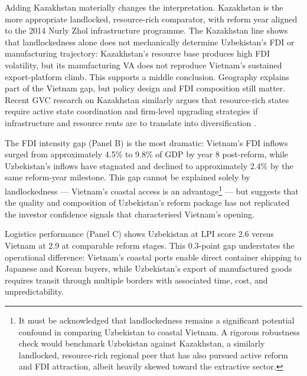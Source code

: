 \documentclass[14pt,a4paper]{extarticle}
\begin{document}
Adding Kazakhstan materially changes the interpretation. Kazakhstan is the more appropriate landlocked, resource-rich comparator, with reform year aligned to the 2014 Nurly Zhol infrastructure programme. The Kazakhstan line shows that landlockedness alone does not mechanically determine Uzbekistan's FDI or manufacturing trajectory: Kazakhstan's resource base produces high FDI volatility, but its manufacturing VA does not reproduce Vietnam's sustained export-platform climb. This supports a middle conclusion. Geography explains part of the Vietnam gap, but policy design and FDI composition still matter. Recent GVC research on Kazakhstan similarly argues that resource-rich states require active state coordination and firm-level upgrading strategies if infrastructure and resource rents are to translate into diversification \citep{deremer2025kazakhstan}.

The FDI intensity gap (Panel B) is the most dramatic: Vietnam's FDI inflows surged from approximately 4.5\% to 9.8\% of GDP by year 8 post-reform, while Uzbekistan's inflows have stagnated and declined to approximately 2.4\% by the same reform-year milestone. This gap cannot be explained solely by landlockedness --- Vietnam's coastal access is an advantage\footnote{It must be acknowledged that landlockedness remains a significant potential confound in comparing Uzbekistan to coastal Vietnam. A rigorous robustness check would benchmark Uzbekistan against Kazakhstan, a similarly landlocked, resource-rich regional peer that has also pursued active reform and FDI attraction, albeit heavily skewed toward the extractive sector.} --- but suggests that the quality and composition of Uzbekistan's reform package has not replicated the investor confidence signals that characterised Vietnam's opening.

Logistics performance (Panel C) shows Uzbekistan at LPI score 2.6 versus Vietnam at 2.9 at comparable reform stages. This 0.3-point gap understates the operational difference: Vietnam's coastal ports enable direct container shipping to Japanese and Korean buyers, while Uzbekistan's export of manufactured goods requires transit through multiple borders with associated time, cost, and unpredictability.


\newpage


\newpage


\newpage

\end{document}
